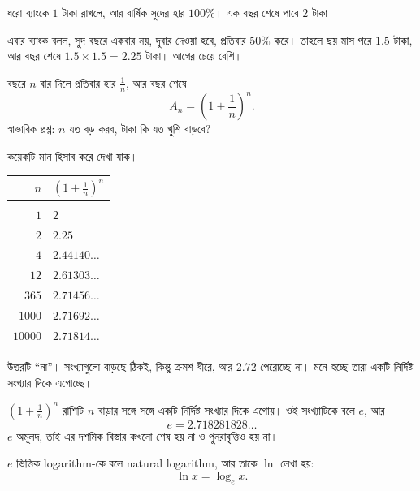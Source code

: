 \documentclass[11pt]{article}
\begin{document}
\begin{idea}[চক্রবৃদ্ধি সুদের প্রশ্ন]
ধরো ব্যাংকে $1$ টাকা রাখলে, আর বার্ষিক সুদের হার $100\%$। এক বছর শেষে পাবে
$2$ টাকা।

এবার ব্যাংক বলল, সুদ বছরে একবার নয়, দুবার দেওয়া হবে, প্রতিবার $50\%$ করে।
তাহলে ছয় মাস পরে $1.5$ টাকা, আর বছর শেষে $1.5 \times 1.5 = 2.25$ টাকা। আগের
চেয়ে বেশি।

বছরে $n$ বার দিলে প্রতিবার হার $\tfrac{1}{n}$, আর বছর শেষে
\[
  A_n = \left( 1 + \frac{1}{n} \right)^{n} .
\]
স্বাভাবিক প্রশ্ন: $n$ যত বড় করব, টাকা কি যত খুশি বাড়বে?
\end{idea}

\noindent
কয়েকটি মান হিসাব করে দেখা যাক।

\begin{center}
\begin{tabular}{@{}r l@{}}
$n$ & $\left( 1 + \tfrac{1}{n} \right)^{n}$ \\[2pt]
\hline \\[-8pt]
$1$ & $2$ \\
$2$ & $2.25$ \\
$4$ & $2.44140\ldots$ \\
$12$ & $2.61303\ldots$ \\
$365$ & $2.71456\ldots$ \\
$1000$ & $2.71692\ldots$ \\
$10000$ & $2.71814\ldots$ \\
\end{tabular}
\end{center}

\noindent
উত্তরটি ``না''। সংখ্যাগুলো বাড়ছে ঠিকই, কিন্তু ক্রমশ ধীরে, আর $2.72$ পেরোচ্ছে
না। মনে হচ্ছে তারা একটি নির্দিষ্ট সংখ্যার দিকে এগোচ্ছে।

\begin{idea}[সংখ্যা $e$]
$\left( 1 + \tfrac{1}{n} \right)^{n}$ রাশিটি $n$ বাড়ার সঙ্গে সঙ্গে একটি
নির্দিষ্ট সংখ্যার দিকে এগোয়। ওই সংখ্যাটিকে বলে $e$, আর
\[
  e = 2.718281828\ldots
\]
$e$ অমূলদ, তাই এর দশমিক বিস্তার কখনো শেষ হয় না ও পুনরাবৃত্তিও হয় না।

$e$ ভিত্তিক logarithm-কে বলে natural logarithm, আর তাকে $\ln$ লেখা হয়:
\[
  \ln x = \log_e x .
\]
\end{idea}
\end{document}
